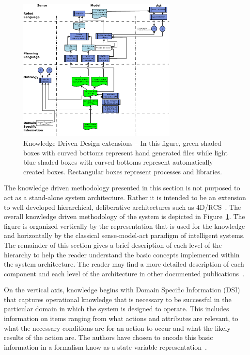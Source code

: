 \begin{figure}[ht!]
\centering
\includegraphics[width=8cm]{images/KnowledgeDrivenRobotics.pdf}
\caption{Knowledge Driven Design extensions – In this figure, green shaded boxes with
curved bottoms represent hand generated files while light blue shaded boxes with curved
bottoms represent automatically created boxes. Rectangular boxes represent processes
and libraries.
}
\label{fig:methodology}
\end{figure}
The knowledge driven methodology presented in this section is not purposed to act as a stand-alone system architecture. Rather it is intended to be an extension to well developed hierarchical, deliberative architectures such as 4D/RCS~\cite{Albus2000}. The overall knowledge driven methodology of the system is depicted in Figure~\ref{fig:methodology}. The figure is organized vertically by the representation that is used for the knowledge and horizontally by the classical sense-model-act paradigm of intelligent systems. The remainder of this section gives a brief description of each level of the hierarchy to help the reader understand the basic concepts implemented within the system architecture. The reader may find a more detailed description of each component and each level of the architecture in other documented publications~\cite{BALAKIRSKY.IROS.2012,NISTIR.Balakirsky}.

On the vertical axis, knowledge begins with Domain Specific Information (DSI) that captures operational knowledge that is necessary to be successful in the particular domain in which the system is designed to operate. This includes information on items ranging from what actions and attributes are relevant, to what the necessary conditions are for an action to occur and what the likely results of the action are. The authors have chosen to encode this basic information in a formalism know as a state variable representation~\cite{NAU.2004}.

